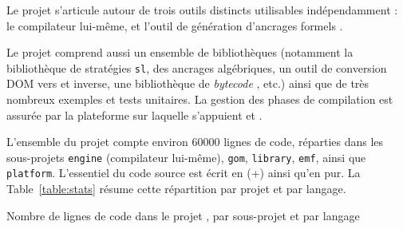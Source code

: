 Le projet {\tom} s'articule autour de trois outils distincts utilisables
indépendamment : le compilateur lui-même, {\gom} et l'outil de génération
d'ancrages formels {\tomemf}.

Le projet {\tom} comprend aussi un ensemble de bibliothèques (notamment la
bibliothèque de stratégies \texttt{sl}, des ancrages algébriques, un outil de
conversion {DOM \xml} vers {\gom} et inverse, une bibliothèque de
\emph{bytecode} {\java}, etc.) ainsi que de très nombreux exemples et tests
unitaires. La gestion des phases de compilation est assurée par la plateforme
sur laquelle s'appuient {\tom} et {\gom}.


L'ensemble du projet compte environ \num{60000} lignes de code, réparties dans les
sous-projets \texttt{engine} (compilateur {\tom} lui-même), \texttt{gom},
\texttt{library}, \texttt{emf}, ainsi que \texttt{platform}. L'essentiel du
code source est écrit en {\tom} (+{\java}) ainsi qu'en {\java} pur. La
Table~\ref{table:stats} résume cette répartition par projet et par langage.

\begin{table}[H]
  \begin{center}
    
    \caption{Nombre de lignes de code dans le projet {\tom}, par sous-projet et par langage}
    \label{table:stats}
  \end{center}
\end{table}



